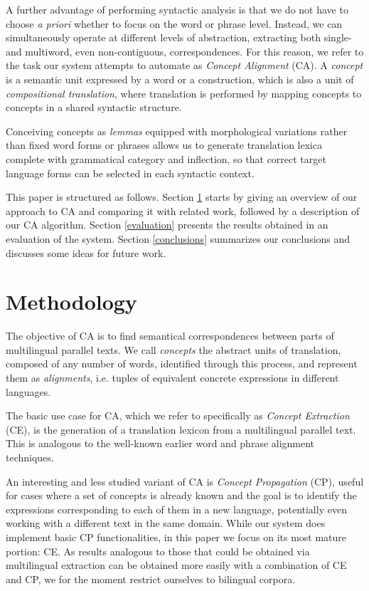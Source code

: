 \documentclass[11pt]{article}
\begin{document}
A further advantage of performing syntactic analysis is that we do not have to choose \textit{a priori} whether to focus on the word or phrase level. 
Instead, we can simultaneously operate at different levels of abstraction, extracting both single- and multiword, even non-contiguous, correspondences. 
For this reason, we refer to the task our system attempts to automate as \textit{Concept Alignment} (CA). 
A \textit{concept} is a semantic unit expressed by a word or a construction, which is also a unit of \textit{compositional translation}, where translation is performed by mapping concepts to concepts in a shared syntactic structure.

Conceiving concepts as \textit{lemmas} equipped with morphological variations rather than fixed word forms or phrases allows us to generate translation lexica complete with grammatical category and inflection, so that correct target language forms can be selected in each syntactic context.

This paper is structured as follows. 
Section \ref{methodology} starts by giving an overview of our approach to CA and comparing it with related work, followed by a description of our CA algorithm.
Section \ref{evaluation} presents the results obtained in an evaluation of the system.
Section \ref{conclusions} summarizes our conclusions and discusses some ideas for future work. 

\section{Methodology} \label{methodology}
The objective of CA is to find semantical correspondences between parts of multilingual parallel texts. 
We call \textit{concepts} the abstract units of translation, composed of any number of words, identified through this process, and represent them as \textit{alignments}, i.e. tuples of equivalent concrete expressions in different languages.

The basic use case for CA, which we refer to specifically as \textit{Concept Extraction} (CE), is the generation of a translation lexicon from a multilingual parallel text.
This is analogous to the well-known earlier word and phrase alignment techniques. 

An interesting and less studied variant of CA is \textit{Concept Propagation} (CP), useful for cases where a set of concepts is already known and the goal is to identify the expressions corresponding to each of them in a new language, potentially even working with a different text in the same domain.
While our system does implement basic CP functionalities, in this paper we focus on its most mature portion: CE. 
As results analogous to those that could be obtained via multilingual extraction can be obtained more easily with a combination of CE and CP, we for the moment restrict ourselves to bilingual corpora.  
\end{document}
